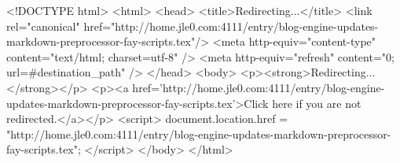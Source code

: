 <!DOCTYPE html>
<html>
<head>
<title>Redirecting...</title>
<link rel="canonical" href="http://home.jle0.com:4111/entry/blog-engine-updates-markdown-preprocessor-fay-scripts.tex"/>
<meta http-equiv="content-type" content="text/html; charset=utf-8" />
<meta http-equiv="refresh" content="0; url=#{destination_path}" />
</head>
<body>
  <p><strong>Redirecting...</strong></p>
  <p><a href='http://home.jle0.com:4111/entry/blog-engine-updates-markdown-preprocessor-fay-scripts.tex'>Click here if you are not redirected.</a></p>
  <script>
    document.location.href = "http://home.jle0.com:4111/entry/blog-engine-updates-markdown-preprocessor-fay-scripts.tex";
  </script>
</body>
</html>
